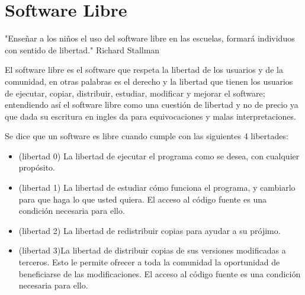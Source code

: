 \documentclass[a4paper]{article}
\begin{document}
\section{Software Libre}
"Enseñar a los niños el uso del software libre en las escuelas, formará individuos con sentido de libertad." Richard Stallman

El software libre es el software que respeta la libertad de los usuarios y de la comunidad, en otras palabras es el derecho y la libertad que tienen los usuarios de ejecutar, copiar, distribuir, estudiar, modificar y mejorar el software; entendiendo así el software libre como una cuestión de libertad y no de precio ya que dada su escritura en ingles da para equivocaciones y malas interpretaciones.

Se dice que un software es libre cuando cumple con las siguientes 4 libertades:
\begin{itemize}
\item (libertad 0) La libertad de ejecutar el programa como se desea, con cualquier propósito.
\item (libertad 1) La libertad de estudiar cómo funciona el programa, y cambiarlo para que haga lo que usted quiera. El acceso al código fuente es una condición necesaria para ello.
\item (libertad 2) La libertad de redistribuir copias para ayudar a su prójimo.
\item (libertad 3)La libertad de distribuir copias de sus versiones modificadas a terceros. Esto le permite ofrecer a toda la comunidad la oportunidad de beneficiarse de las modificaciones. El acceso al código fuente es una condición necesaria para ello.
\end{itemize}
\end{document}

